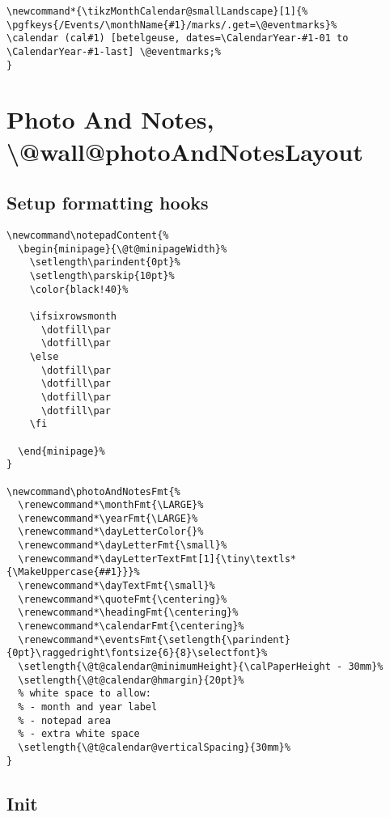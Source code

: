\documentclass[11pt,oneside]{memoir-article}
\begin{document}
\begin{verbatim}
\newcommand*{\tikzMonthCalendar@smallLandscape}[1]{%
\pgfkeys{/Events/\monthName{#1}/marks/.get=\@eventmarks}%
\calendar (cal#1) [betelgeuse, dates=\CalendarYear-#1-01 to \CalendarYear-#1-last] \@eventmarks;%
}
\end{verbatim}

\section{Photo And Notes, \textbackslash @wall@photoAndNotesLayout}
\label{sec:org6734396}
\subsection{Setup formatting hooks}
\label{sec:orgef61b00}

\begin{verbatim}
\newcommand\notepadContent{%
  \begin{minipage}{\@t@minipageWidth}%
    \setlength\parindent{0pt}%
    \setlength\parskip{10pt}%
    \color{black!40}%

    \ifsixrowsmonth
      \dotfill\par
      \dotfill\par
    \else
      \dotfill\par
      \dotfill\par
      \dotfill\par
      \dotfill\par
    \fi

  \end{minipage}%
}

\newcommand\photoAndNotesFmt{%
  \renewcommand*\monthFmt{\LARGE}%
  \renewcommand*\yearFmt{\LARGE}%
  \renewcommand*\dayLetterColor{}%
  \renewcommand*\dayLetterFmt{\small}%
  \renewcommand*\dayLetterTextFmt[1]{\tiny\textls*{\MakeUppercase{##1}}}%
  \renewcommand*\dayTextFmt{\small}%
  \renewcommand*\quoteFmt{\centering}%
  \renewcommand*\headingFmt{\centering}%
  \renewcommand*\calendarFmt{\centering}%
  \renewcommand*\eventsFmt{\setlength{\parindent}{0pt}\raggedright\fontsize{6}{8}\selectfont}%
  \setlength{\@t@calendar@minimumHeight}{\calPaperHeight - 30mm}%
  \setlength{\@t@calendar@hmargin}{20pt}%
  % white space to allow:
  % - month and year label
  % - notepad area
  % - extra white space
  \setlength{\@t@calendar@verticalSpacing}{30mm}%
}
\end{verbatim}

\subsection{Init}
\label{sec:orgb4a0701}
\end{document}
